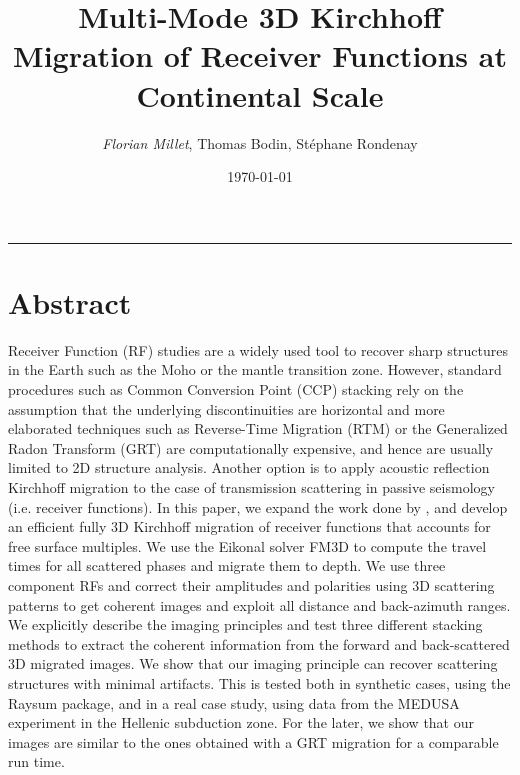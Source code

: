 \documentclass[10pt,a4paper]{article}
\title{Multi-Mode 3D Kirchhoff Migration of Receiver Functions at Continental Scale}
\author{\textit{Florian Millet}, Thomas Bodin, Stéphane Rondenay}
\date{\today}
\renewcommand{\thepage}{}
\numberwithin{equation}{section}
\begin{document}

\renewcommand{\thepage}{\arabic{page}}
\setcounter{page}{1}

\maketitle

\begin{center}\rule{4cm}{.55pt}\end{center}
\vspace{-2mm}

\section*{Abstract}

Receiver Function (RF) studies are a widely used tool to recover sharp structures in the Earth such as the Moho or the mantle transition zone.
However, standard procedures such as Common Conversion Point (CCP) stacking rely on the assumption that the underlying discontinuities are horizontal and more elaborated techniques such as Reverse-Time Migration (RTM) or the Generalized Radon Transform (GRT) are computationally expensive, and hence are usually limited to 2D structure analysis.
Another option is to apply acoustic reflection Kirchhoff migration to the case of transmission scattering in passive seismology (i.e. receiver functions).
In this paper, we expand the work done by \cite{cheng_gji_16}, and develop an efficient fully 3D Kirchhoff migration of receiver functions that accounts for free surface multiples.
We use the Eikonal solver FM3D to compute the travel times for all scattered phases and migrate them to depth.
We use three component RFs and correct their amplitudes and polarities using 3D scattering patterns to get coherent images and exploit all distance and back-azimuth ranges.
We explicitly describe the imaging principles and test three different stacking methods to extract the coherent information from the forward and back-scattered 3D migrated images.
We show that our imaging principle can recover scattering structures with minimal artifacts.
This is tested both in synthetic cases, using the Raysum package, and in a real case study, using data from the MEDUSA experiment in the Hellenic subduction zone.
For the later, we show that our images are similar to the ones obtained with a GRT migration for a comparable run time.
\end{document}
